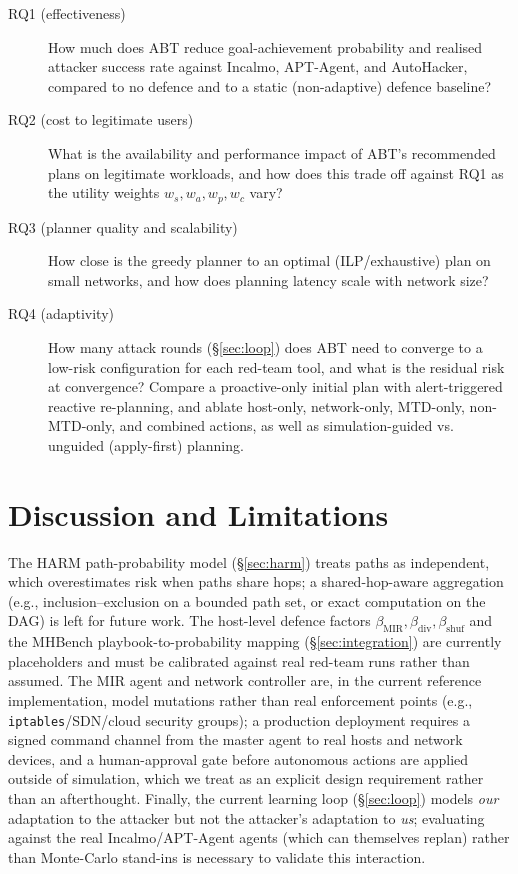 \documentclass[conference]{IEEEtran}
\begin{document}
\begin{description}
\item[RQ1 (effectiveness)] How much does ABT reduce goal-achievement probability
  and realised attacker success rate against Incalmo, APT-Agent, and AutoHacker,
  compared to no defence and to a static (non-adaptive) defence baseline?
\item[RQ2 (cost to legitimate users)] What is the availability and performance
  impact of ABT's recommended plans on legitimate workloads, and how does this
  trade off against RQ1 as the utility weights $w_s,w_a,w_p,w_c$ vary?
\item[RQ3 (planner quality and scalability)] How close is the greedy planner to an
  optimal (ILP/exhaustive) plan on small networks, and how does planning latency
  scale with network size?
\item[RQ4 (adaptivity)] How many attack rounds (\S\ref{sec:loop}) does ABT need to
  converge to a low-risk configuration for each red-team tool, and what is the
  residual risk at convergence? Compare a proactive-only initial plan with
  alert-triggered reactive re-planning, and ablate host-only, network-only, MTD-only,
  non-MTD-only, and combined actions, as well as simulation-guided vs. unguided
  (apply-first) planning.
\end{description}

\section{Discussion and Limitations}
\label{sec:limitations}

The HARM path-probability model (\S\ref{sec:harm}) treats paths as independent,
which overestimates risk when paths share hops; a shared-hop-aware aggregation (e.g.,
inclusion--exclusion on a bounded path set, or exact computation on the DAG) is left
for future work. The host-level defence factors
$\beta_{\mathrm{MIR}},\beta_{\mathrm{div}},\beta_{\mathrm{shuf}}$ and the MHBench
playbook-to-probability mapping (\S\ref{sec:integration}) are currently placeholders
and must be calibrated against real red-team runs rather than assumed. The MIR agent
and network controller are, in the current reference implementation, model mutations
rather than real enforcement points (e.g., \texttt{iptables}/SDN/cloud security
groups); a production deployment requires a signed command channel from the master
agent to real hosts and network devices, and a human-approval gate before autonomous
actions are applied outside of simulation, which we treat as an explicit design
requirement rather than an afterthought. Finally, the current learning loop
(\S\ref{sec:loop}) models \emph{our} adaptation to the attacker but not the
attacker's adaptation to \emph{us}; evaluating against the real Incalmo/APT-Agent
agents (which can themselves replan) rather than Monte-Carlo stand-ins is necessary
to validate this interaction.
\end{document}
